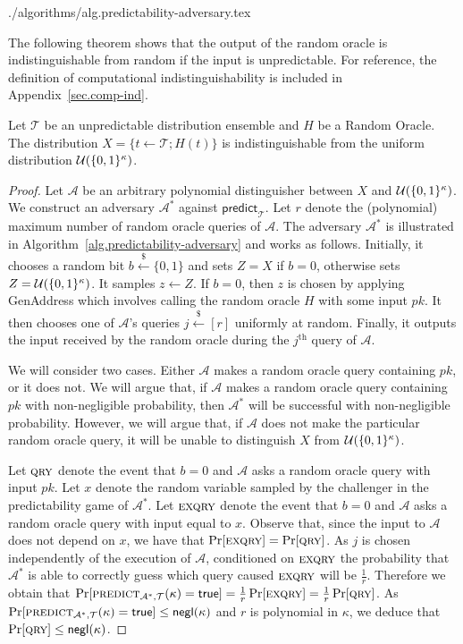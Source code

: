 {./algorithms/alg.predictability-adversary.tex}

The following theorem shows that the output of the random oracle is
indistinguishable from random if the input is unpredictable. For reference, the
definition of computational indistinguishability is included in
Appendix~\ref{sec.comp-ind}.

\begin{lemma}\label{lem:ro-unpredictability}
  Let $\mathcal{T}$ be an unpredictable distribution ensemble and $H$ be a
  Random Oracle.
  The distribution $X = \{t \gets \mathcal{T}; H(t)\}$ is indistinguishable from
  the uniform distribution $\mathcal{U}(\{0,1\}^\kappa)$.
\end{lemma}
\begin{proof}
  Let $\mathcal{A}$ be an arbitrary polynomial distinguisher between
  $X$ and $\mathcal{U}(\{0, 1\}^\kappa)$.
  We construct an adversary $\mathcal{A}^*$
  against $\textsf{predict}_{\mathcal{T}}$.
  Let $r$ denote the (polynomial)
  maximum number of random oracle queries of $\mathcal{A}$.
  The adversary $\mathcal{A}^*$ is illustrated in
  Algorithm~\ref{alg.predictability-adversary} and works as follows.
  Initially, it chooses a random bit $b \stackrel{\$}{\gets} \{0, 1\}$ and
  sets $Z = X$ if $b = 0$, otherwise
  sets $Z = \mathcal{U}(\{0,1\}^\kappa)$.
  It samples $z \gets Z$.
  If $b = 0$, then $z$ is chosen by applying \textsf{GenAddress} which involves
  calling the random oracle $H$ with some input $pk$.
  It then chooses one of $\mathcal{A}$'s queries $j \stackrel{\$}{\gets} [r]$
  uniformly at random. Finally, it outputs the input received by the random
  oracle during the $j^\text{th}$ query of $\mathcal{A}$.

  We will consider two cases. Either $\mathcal{A}$ makes a random oracle query
  containing $pk$, or it does not. We will argue that, if $\mathcal{A}$ makes
  a random oracle query containing $pk$ with non-negligible probability, then
  $\mathcal{A}^*$ will be successful with non-negligible probability. However,
  we will argue that, if $\mathcal{A}$ does not make the particular random
  oracle query, it will be unable to distinguish $X$ from $\mathcal{U}(\{0,1\}^\kappa)$.

  Let $\textsc{qry}$ denote the event that $b = 0$ and $\mathcal{A}$ asks a random
  oracle query with input $pk$.
  Let $x$ denote the random variable sampled by the challenger in the
  predictability game of $\mathcal{A}^*$.
  Let $\textsc{exqry}$ denote the event that $b = 0$ and $\mathcal{A}$ asks a
  random oracle query with input equal to $x$. Observe that, since the input to
  $\mathcal{A}$ does not depend on $x$, we have that
  $\Pr[\textsc{exqry}] = \Pr[\textsc{qry}]$. As $j$ is chosen independently of the execution
  of $\mathcal{A}$, conditioned on $\textsc{exqry}$ the probability that
  $\mathcal{A}^*$ is able to correctly guess which query caused $\textsc{exqry}$ will
  be $\frac{1}{r}$. Therefore we obtain that
  $\Pr[\textsc{predict}_{\mathcal{A}^*,\mathcal{T}}(\kappa) = \mathsf{true}]
   = \frac{1}{r}\Pr[\textsc{exqry}]
   = \frac{1}{r}\Pr[\textsc{qry}]$.
  As
  $\Pr[\textsc{predict}_{\mathcal{A}^*,\mathcal{T}}(\kappa) = \mathsf{true}] \leq \textsf{negl}(\kappa)$
  and $r$
  is polynomial in $\kappa$, we deduce that $\Pr[\textsc{qry}] \leq \textsf{negl}(\kappa)$.


\end{proof}
